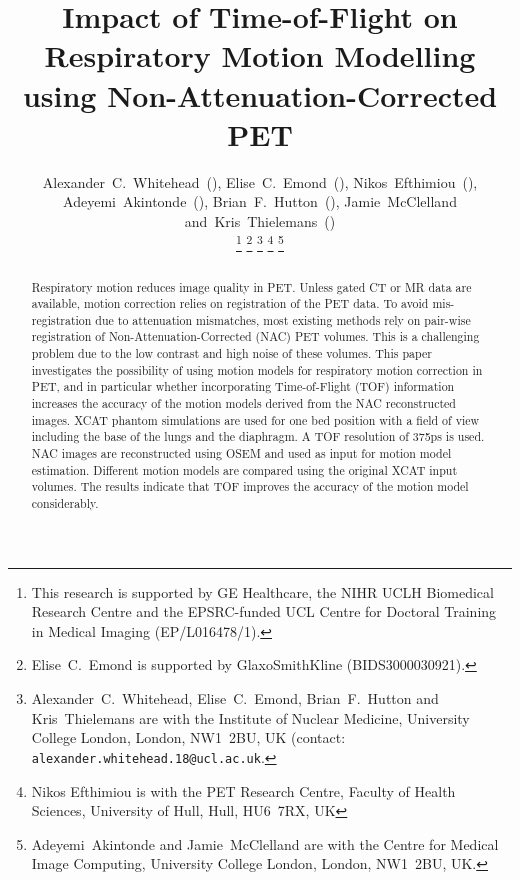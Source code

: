 \documentclass{IEEEtran}
\begin{document}
\title{Impact of Time-of-Flight on Respiratory Motion Modelling using Non-Attenuation-Corrected PET}

\author{Alexander~C.~Whitehead~(),
        Elise~C.~Emond~(),
        Nikos~Efthimiou~(),
        Adeyemi~Akintonde~(),
        Brian~F.~Hutton~(),
        Jamie~McClelland
        and~Kris~Thielemans~()%
        
    \vspace{-0.5cm}

    \thanks{This research is supported by GE Healthcare, the NIHR UCLH Biomedical Research Centre and the EPSRC-funded UCL Centre for Doctoral Training in Medical Imaging (EP/L016478/1).}%
    \thanks{Elise~C.~Emond is supported by GlaxoSmithKline (BIDS3000030921).}%
    \thanks{Alexander~C.~Whitehead, Elise~C.~Emond, Brian~F.~Hutton and Kris~Thielemans are with the Institute of Nuclear Medicine, University College London, London, NW1~2BU, UK (contact: \texttt{alexander.whitehead.18@ucl.ac.uk}.}%
    \thanks{Nikos Efthimiou is with the PET Research Centre, Faculty of Health Sciences, University of Hull, Hull, HU6~7RX, UK}%
    \thanks{Adeyemi~Akintonde and Jamie~McClelland are with the Centre for Medical Image Computing, University College London, London, NW1~2BU, UK.}%
}

\maketitle
\vspace{-1cm}

\IEEEpeerreviewmaketitle
\vspace{-1cm}

\begin{abstract}
Respiratory motion reduces image quality in PET. Unless gated CT or MR data are available, motion correction relies on registration of the PET data. To avoid mis-registration due to attenuation mismatches, most existing methods rely on pair-wise registration of Non-Attenuation-Corrected (NAC) PET volumes. This is a challenging problem due to the low contrast and high noise of these volumes. This paper investigates the possibility of using motion models for respiratory motion correction in PET, and in particular whether incorporating Time-of-Flight (TOF) information increases the accuracy of the motion models derived from the NAC reconstructed images. XCAT phantom simulations are used for one bed position with a field of view including the base of the lungs and the diaphragm. A TOF resolution of 375ps is used. NAC images are reconstructed using OSEM and used as input for motion model estimation. Different motion models are compared using the original XCAT input volumes. The results indicate that TOF improves the accuracy of the motion model considerably.

\end{abstract}
\end{document}

